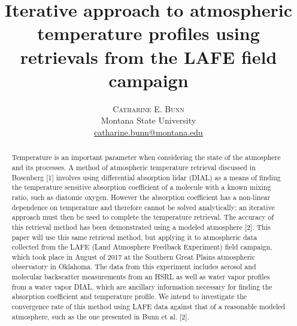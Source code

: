 \documentclass[twoside]{article}
\title{\vspace{-15mm}\fontsize{22pt}{10pt}\selectfont\textbf{Iterative approach to atmospheric temperature profiles using retrievals from the LAFE field campaign}} %
\author{
\large
\textsc{Catharine E. Bunn}\\[2mm] %
\normalsize Montana State University \\ %
\normalsize \href{mailto:catharine.bunn@montana.edu}{catharine.bunn@montana.edu} %
\vspace{-5mm}
}
\date{}
\begin{document}
\maketitle %

\thispagestyle{fancy} %



\begin{abstract}
\noindent Temperature is an important parameter when considering the state of the atmosphere and its processes. 
A method of atmospheric temperature retrieval discussed in Bosenberg [1] involves using differential absorption lidar (DIAL) as a means of finding the temperature sensitive absorption coefficient of a molecule with a known mixing ratio, such as diatomic oxygen. 
However the absorption coefficient has a non-linear dependence on temperature and therefore cannot be solved analytically; an iterative approach must then be used to complete the temperature retrieval.
 The accuracy of this retrieval method has been demonstrated using a modeled atmosphere [2]. 
 This paper will use this same retrieval method, but applying it to atmospheric data collected from the LAFE (Land Atmosphere Feedback Experiment) field campaign, which took place in August of 2017 at the Southern Great Plains atmospheric observatory in Oklahoma. 
 The data from this experiment includes aerosol and molecular backscatter measurements from an HSRL as well as water vapor profiles from a water vapor DIAL, which are ancillary information necessary for finding the absorption coefficient and temperature profile.
 We intend to investigate the convergence rate of this method using LAFE data against that of a reasonable modeled atmosphere, such as the one presented in Bunn et al. [2].
\end{abstract}
\end{document}
